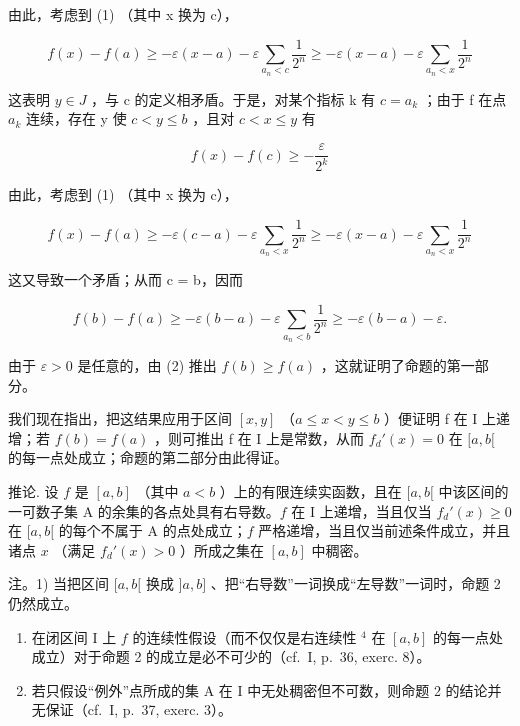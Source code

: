 由此，考虑到 (1) （其中 x 换为 c），

\[
f (x) - f (a) \geqslant - \varepsilon (x - a) - \varepsilon \sum_ {a _ {n} <   c} \frac {1}{2 ^ {n}} \geqslant - \varepsilon (x - a) - \varepsilon \sum_ {a _ {n} <   x} \frac {1}{2 ^ {n}}
\]

这表明 \(y \in J\) ，与 c 的定义相矛盾。于是，对某个指标 k 有 \(c = a_{k}\) ；由于 f 在点 \(a_{k}\) 连续，存在 y 使 \(c < y \leqslant b\) ，且对 \(c < x \leqslant y\) 有

\[
f (x) - f (c) \geqslant - \frac {\varepsilon}{2 ^ {k}}
\]

由此，考虑到 (1) （其中 x 换为 c），

\[
f (x) - f (a) \geqslant - \varepsilon (c - a) - \varepsilon \sum_ {a _ {n} <   x} \frac {1}{2 ^ {n}} \geqslant - \varepsilon (x - a) - \varepsilon \sum_ {a _ {n} <   x} \frac {1}{2 ^ {n}}
\]

这又导致一个矛盾；从而 c = b，因而

\[
f (b) - f (a) \geqslant - \varepsilon (b - a) - \varepsilon \sum_ {a _ {n} <   b} \frac {1}{2 ^ {n}} \geqslant - \varepsilon (b - a) - \varepsilon .\tag{2}
\]

由于 \(\varepsilon > 0\) 是任意的，由 (2) 推出 \(f(b) \geqslant f(a)\) ，这就证明了命题的第一部分。

我们现在指出，把这结果应用于区间 \([x, y]\) （\(a \leqslant x < y \leqslant b\) ）便证明 f 在 I 上递增；若 \(f(b) = f(a)\) ，则可推出 f 在 I 上是常数，从而 \(f_{d}'(x) = 0\) 在 \([a, b[\) 的每一点处成立；命题的第二部分由此得证。

推论. 设 \(f\) 是 \([a, b]\) （其中 \(a < b\) ）上的有限连续实函数，且在 \([a, b[\) 中该区间的一可数子集 A 的余集的各点处具有右导数。\(f\) 在 I 上递增，当且仅当 \(f_d'(x) \geqslant 0\) 在 \([a, b[\) 的每个不属于 A 的点处成立；\(f\) 严格递增，当且仅当前述条件成立，并且诸点 \(x\) （满足 \(f_d'(x) > 0\) ）所成之集在 \([a, b]\) 中稠密。

注。1) 当把区间 \([a, b[\) 换成 \(]a, b]\) 、把“右导数”一词换成“左导数”一词时，命题 2 仍然成立。

\begin{enumerate}
\def\labelenumi{\arabic{enumi})}
\setcounter{enumi}{1}
\item
  在闭区间 I 上 \(f\) 的连续性假设（而不仅仅是右连续性 \(^{4}\) 在 \([a, b]\) 的每一点处成立）对于命题 2 的成立是必不可少的（cf.~I, p.~36, exerc. 8）。
\item
  若只假设“例外”点所成的集 A 在 I 中无处稠密但不可数，则命题 2 的结论并无保证（cf.~I, p.~37, exerc. 3）。
\end{enumerate}

